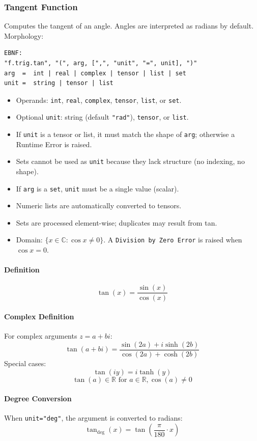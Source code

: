 \subsubsection{Tangent Function}
Computes the tangent of an angle. Angles are interpreted as radians by default.\\
Morphology:
\begin{verbatim}
EBNF:
"f.trig.tan", "(", arg, [",", "unit", "=", unit], ")"
arg  =  int | real | complex | tensor | list | set
unit =  string | tensor | list
\end{verbatim}
\begin{itemize}
\item Operands: \texttt{int}, \texttt{real}, \texttt{complex}, \texttt{tensor}, \texttt{list}, or \texttt{set}.
\item Optional \texttt{unit}: string (default \texttt{"rad"}), \texttt{tensor}, or \texttt{list}.
\item If \texttt{unit} is a tensor or list, it must match the shape of \texttt{arg}; otherwise a Runtime Error is raised.
\item Sets cannot be used as \texttt{unit} because they lack structure (no indexing, no shape).
\item If \texttt{arg} is a \texttt{set}, \texttt{unit} must be a single value (scalar).
\item Numeric lists are automatically converted to tensors.
\item Sets are processed element-wise; duplicates may result from tan.
\item Domain: $\{x \in \mathbb{C} : \cos x \neq 0\}$. A \texttt{Division by Zero Error} is raised when $\cos x = 0$.
\end{itemize}

\paragraph{Definition}
\[
\tan(x) = \frac{\sin(x)}{\cos(x)}
\]

\paragraph{Complex Definition}
For complex arguments $z = a + bi$:
\[
\tan(a + bi) = \frac{\sin(2a) + i\sinh(2b)}{\cos(2a) + \cosh(2b)}
\]
Special cases:
\[
\tan(iy) = i\tanh(y)
\]
\[
\tan(a) \in \mathbb{R} \text{ for } a \in \mathbb{R}, \cos(a) \neq 0
\]

\paragraph{Degree Conversion}
When \texttt{unit="deg"}, the argument is converted to radians:
\[
\tan_{\text{deg}}(x) = \tan\left(\frac{\pi}{180} \cdot x\right)
\]


